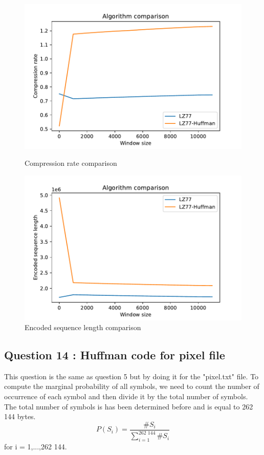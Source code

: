 \documentclass[titlepage]{article}
\begin{document}
\begin{figure}[h!]
    \begin{minipage}[c]{0.5\linewidth}
        \centering
        \includegraphics[scale = 0.5]{Q13_c.pdf}
        \caption{Compression rate comparison}
        \label{fig:Q13_c}
    \end{minipage}
    \hfill%
    \begin{minipage}[c]{0.5\linewidth}
        \centering
        \includegraphics[scale = 0.5]{Q13_l.pdf}
        \caption{Encoded sequence length comparison}
        \label{fig:Q13_l}
    \end{minipage}
\end{figure}


\subsection{Question 14 : Huffman code for pixel file}
This question is the same as question 5 but by doing it for the "pixel.txt" file. To compute the marginal probability of all symbols, we need to count the number of occurrence of each symbol and then divide it by the total number of symbols. The total number of symbols is has been determined before and is equal to 262 144 bytes. 
$$ P(S_i) = \frac{\#S_i}{\sum^\text{262 144}_{i=1}\#S_i}$$ for i = 1,...,262 144.
\end{document}
